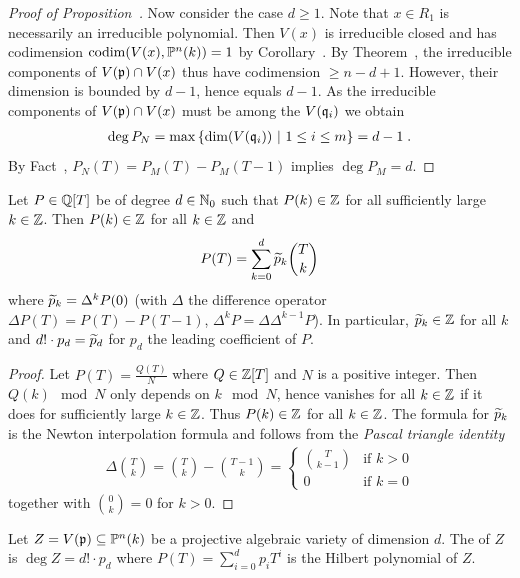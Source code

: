 \documentclass[a4paper,parskip=half,numbers=enddot, DIV=12]{scrreprt}
\begin{document}
\begin{proof}[Proof of Proposition~]
    Now consider the case $d\geq 1$. Note that $x\in R_1$ is necessarily an irreducible polynomial. Then $V(x)$ is irreducible closed and has codimension $\operatorname{codim} (V(x),\mathbb{P}^n(k))=1$ by Corollary~. By Theorem~, the irreducible components of $V(\mathfrak{p})\cap V(x)$ thus have codimension $\geq n-d+1$. However, their dimension is bounded by $d-1$, hence equals $d-1$. As the irreducible components of $V(\mathfrak{p})\cap V(x)$ must be among the $V(\mathfrak{q}_i)$ we obtain 
    \begin{align*}
    	\deg P_N=\max\left\{\dim(V(\mathfrak{q}_i))\ \middle|\  1\leq i\leq m\right\} = d-1\;.
    \end{align*}
    By Fact~, $P_N(T) = P_M(T) - P_M(T-1)$ implies $\deg P_M =d$.
\end{proof}
\begin{lem}[a.k.a. Lemma~1] 
    Let $P\in \mathbb{Q}[T]$ be of degree $d\in\mathbb{N}_0$ such that $P(k)\in \mathbb{Z}$ for all sufficiently large $k\in\mathbb{Z}$. Then $P(k) \in \mathbb{Z}$ for all $k\in \mathbb{Z}$ and 
    \begin{align*}
        P(T) = \sum_{k=0}^d \snake p_k \binom Tk
    \end{align*}
    where $\snake p_k = \Delta^kP(0)$ (with $\Delta$ the difference operator $\Delta P(T) = P(T)-P(T-1)$, $\Delta^k P = \Delta \Delta^{k-1} P$). In particular, $\snake p_k\in\IZ$ for all $k$ and $d!\cdot p_d = \snake p_d$ for $p_d$ the leading coefficient of $P$.
\end{lem}
\begin{proof}
    Let $P(T) = \frac{Q(T)}{N}$ where $Q\in \mathbb{Z}[T]$ and $N$ is a positive integer. Then $Q(k)\mod N$ only depends on $k\mod N$, hence vanishes for all $k\in \mathbb{Z}$ if it does for sufficiently large $k\in \mathbb{Z}$. Thus $P(k)\in \mathbb{Z}$ for all $k\in \mathbb{Z}$. The formula for $\snake p_k$ is the Newton interpolation formula and follows from the \emph{Pascal triangle identity}
    \begin{align*}
        \Delta \binom Tk= \binom{T}{k}-\binom{T-1}{k}= \begin{cases} \binom T{k-1} & \text{if }k>0\\ 0 &\text{if }k=0 \end{cases}
    \end{align*}
    together with $\binom 0k = 0$ for $k>0$.
\end{proof}
\begin{defi}
    Let $Z= V(\mathfrak{p}) \subseteq \mathbb{P}^n(k)$ be a projective algebraic variety of dimension $d$. The  of $Z$ is $\deg Z=d!\cdot p_d$ where $P(T) = \sum_{i=0}^d p_i T^i$ is the Hilbert polynomial of $Z$.
\end{defi}
\end{document}
